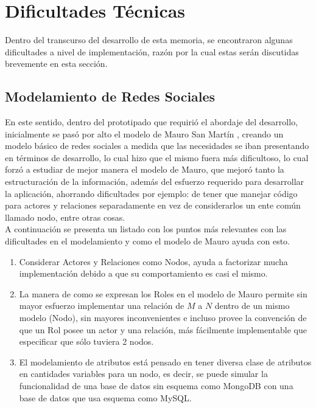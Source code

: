 
\section{Dificultades Técnicas} %
\label{sec:dificultades_tecnicas}


Dentro del transcurso del desarrollo de esta memoria, se encontraron algunas dificultades a nivel de implementación, razón por la cual estas serán discutidas brevemente en esta sección.

\subsection{Modelamiento de Redes Sociales} %
\label{sub:modelamiento_de_redes_sociales}

En este sentido, dentro del prototipado que requirió el abordaje del desarrollo, inicialmente se pasó por alto el modelo de Mauro San Martín \cite{tesismauro}, creando un modelo básico de redes sociales a medida que las necesidades se iban presentando en términos de desarrollo, lo cual hizo que el mismo fuera más dificultoso, lo cual forzó a estudiar de mejor manera el modelo de Mauro, que mejoró tanto la estructuración de la información, además del esfuerzo requerido para desarrollar la aplicación, ahorrando dificultades por ejemplo: de tener que manejar código para actores y relaciones separadamente en vez de considerarlos un ente común llamado nodo, entre otras cosas.\\

A continuación se presenta un listado con los puntos más relevantes con las dificultades en el modelamiento y como el modelo de Mauro ayuda con esto.

  \begin{enumerate}
    \item Considerar Actores y Relaciones como Nodos, ayuda a factorizar mucha implementación debido a que su comportamiento es casi el mismo.
    
    \item La manera de como se expresan los Roles en el modelo de Mauro permite sin mayor esfuerzo implementar una relación de $M$ a $N$ dentro de un mismo modelo (Nodo), sin mayores inconvenientes e incluso provee la convención de que un Rol posee un actor y una relación, más fácilmente implementable que especificar que sólo tuviera 2 nodos.
    
    \item El modelamiento de atributos está pensado en tener diversa clase de atributos en cantidades variables para un nodo, es decir, se puede simular la funcionalidad de una base de datos sin esquema como MongoDB con una base de datos que usa esquema como MySQL.
  \end{enumerate}


